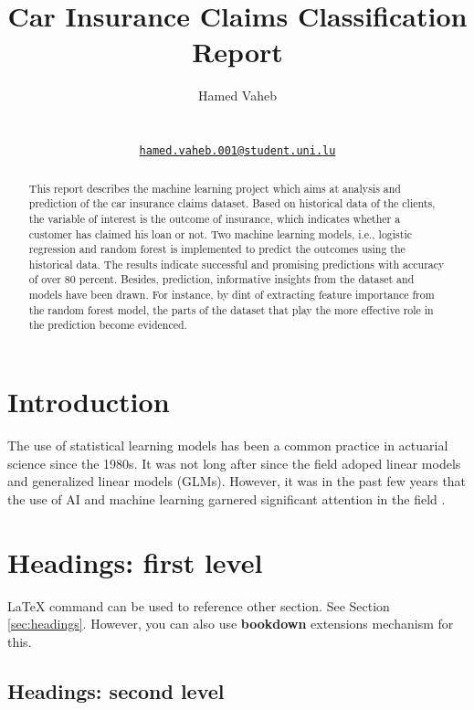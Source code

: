 \documentclass{article}
\title{Car Insurance Claims Classification Report}
\author{
    Hamed Vaheb
   \\
     \\
   \\
  \texttt{\href{mailto:hamed.vaheb.001@student.uni.lu}{\nolinkurl{hamed.vaheb.001@student.uni.lu}}} \\
  }
\begin{document}
\maketitle


\begin{abstract}
This report describes the machine learning project which aims at
analysis and prediction of the car insurance claims dataset. Based on
historical data of the clients, the variable of interest is the outcome
of insurance, which indicates whether a customer has claimed his loan or
not. Two machine learning models, i.e., logistic regression and random
forest is implemented to predict the outcomes using the historical data.
The results indicate successful and promising predictions with accuracy
of over 80 percent. Besides, prediction, informative insights from the
dataset and models have been drawn. For instance, by dint of extracting
feature importance from the random forest model, the parts of the
dataset that play the more effective role in the prediction become
evidenced.
\end{abstract}


\hypertarget{introduction}{%
\section{Introduction}\label{introduction}}

The use of statistical learning models has been a common practice in
actuarial science since the 1980s. It was not long after since the field
adoped linear models and generalized linear models (GLMs). However, it
was in the past few years that the use of AI and machine learning
garnered significant attention in the field \cite{rev1}.

\hypertarget{headings-first-level}{%
\section{Headings: first level}\label{headings-first-level}}

\label{sec:headings}

LaTeX command can be used to reference other section. See Section
\ref{sec:headings}. However, you can also use \textbf{bookdown}
extensions mechanism for this.

\hypertarget{headings-second-level}{%
\subsection{Headings: second level}\label{headings-second-level}}
\end{document}

